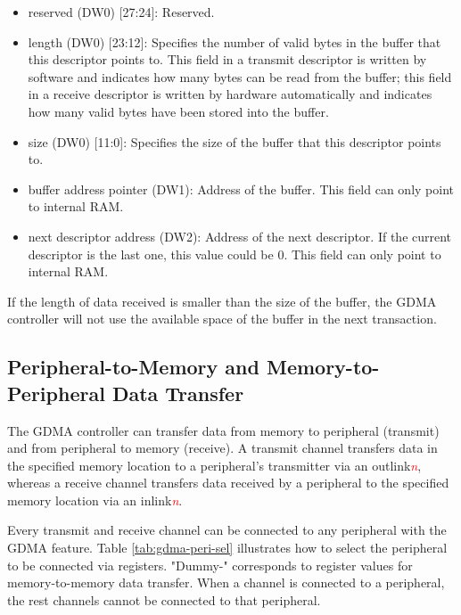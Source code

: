 \documentclass[main\_\_EN.tex]{subfiles}
\begin{document}
\begin{itemize}
    1: The received data has errors.\\
    This bit is used only when UHCI or PARLIO uses GDMA to receive data. When an error is detected in the received data segment corresponding to a descriptor, this bit in the receive descriptor is set to 1 by hardware.
    \item reserved (DW0) [27:24]: Reserved.
    \item length (DW0) [23:12]: Specifies the number of valid bytes in the buffer that this descriptor points to. This field in a transmit descriptor is written by software and indicates how many bytes can be read from the buffer; this field in a receive descriptor is written by hardware automatically and indicates how many valid bytes have been stored into the buffer.
    \item size (DW0) [11:0]: Specifies the size of the buffer that this descriptor points to.
    \item buffer address pointer (DW1): Address of the buffer. This field can only point to internal RAM.
    \item next descriptor address (DW2): Address of the next descriptor. If the current descriptor is the last one, this value could be 0. This field can only point to internal RAM.
\end{itemize}

If the length of data received is smaller than the size of the buffer, the GDMA controller will not use the available space of the buffer in the next transaction.

\subsection{Peripheral-to-Memory and Memory-to-Peripheral Data Transfer}

The GDMA controller can transfer data from memory to peripheral (transmit) and from peripheral to memory (receive). A transmit channel transfers data in the specified memory location to a peripheral's transmitter via an outlink\textcolor{red}{\it{n}}, whereas a receive channel transfers data received by a peripheral to the specified memory location via an inlink\textcolor{red}{\it{n}}.

Every transmit and receive channel can be connected to any peripheral with the GDMA feature. Table \ref{tab:gdma-peri-sel} illustrates how to select the peripheral to be connected via registers. "Dummy-" corresponds to register values for memory-to-memory data transfer. When a channel is connected to a peripheral, the rest channels cannot be connected to that peripheral.
\end{document}
